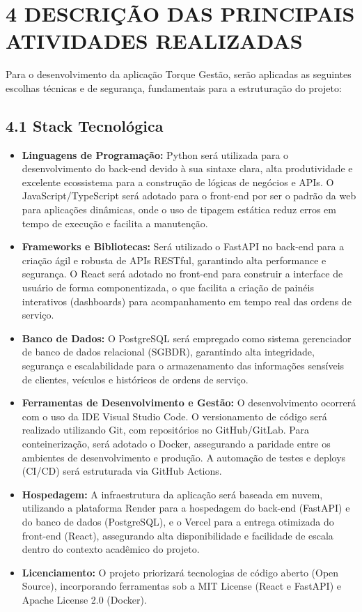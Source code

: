 \documentclass[12pt, a4paper]{article}
\begin{document}
\newpage
{}
\label{sec:atividades}
\section*{4 DESCRI\c{C}\~AO DAS PRINCIPAIS ATIVIDADES REALIZADAS}
 
Para o desenvolvimento da aplica\c{c}\~ao Torque Gest\~ao, ser\~ao aplicadas as seguintes escolhas t\'ecnicas e de seguran\c{c}a, fundamentais para a estrutura\c{c}\~ao do projeto:
 
\subsection*{4.1 Stack Tecnol\'ogica}
 
\begin{itemize}[leftmargin=2cm, itemsep=4pt]
  \item \textbf{Linguagens de Programa\c{c}\~ao:} Python ser\'a utilizada para o desenvolvimento do back-end devido \`a sua sintaxe clara, alta produtividade e excelente ecossistema para a constru\c{c}\~ao de l\'ogicas de neg\'ocios e APIs. O JavaScript/TypeScript ser\'a adotado para o front-end por ser o padr\~ao da web para aplica\c{c}\~oes din\^amicas, onde o uso de tipagem est\'atica reduz erros em tempo de execu\c{c}\~ao e facilita a manuten\c{c}\~ao.
  \item \textbf{Frameworks e Bibliotecas:} Ser\'a utilizado o FastAPI no back-end para a cria\c{c}\~ao \'agil e robusta de APIs RESTful, garantindo alta performance e seguran\c{c}a. O React ser\'a adotado no front-end para construir a interface de usu\'ario de forma componentizada, o que facilita a cria\c{c}\~ao de pain\'eis interativos (dashboards) para acompanhamento em tempo real das ordens de servi\c{c}o.
  \item \textbf{Banco de Dados:} O PostgreSQL ser\'a empregado como sistema gerenciador de banco de dados relacional (SGBDR), garantindo alta integridade, seguran\c{c}a e escalabilidade para o armazenamento das informa\c{c}\~oes sens\'iveis de clientes, ve\'iculos e hist\'oricos de ordens de servi\c{c}o.
  \item \textbf{Ferramentas de Desenvolvimento e Gest\~ao:} O desenvolvimento ocorrer\'a com o uso da IDE Visual Studio Code. O versionamento de c\'odigo ser\'a realizado utilizando Git, com reposit\'orios no GitHub/GitLab. Para conteineriza\c{c}\~ao, ser\'a adotado o Docker, assegurando a paridade entre os ambientes de desenvolvimento e produ\c{c}\~ao. A automa\c{c}\~ao de testes e deploys (CI/CD) ser\'a estruturada via GitHub Actions.
  \item \textbf{Hospedagem:} A infraestrutura da aplica\c{c}\~ao ser\'a baseada em nuvem, utilizando a plataforma Render para a hospedagem do back-end (FastAPI) e do banco de dados (PostgreSQL), e o Vercel para a entrega otimizada do front-end (React), assegurando alta disponibilidade e facilidade de escala dentro do contexto acad\^emico do projeto.
  \item \textbf{Licenciamento:} O projeto priorizar\'a tecnologias de c\'odigo aberto (Open Source), incorporando ferramentas sob a MIT License (React e FastAPI) e Apache License 2.0 (Docker).
\end{itemize}
 
\end{document}
